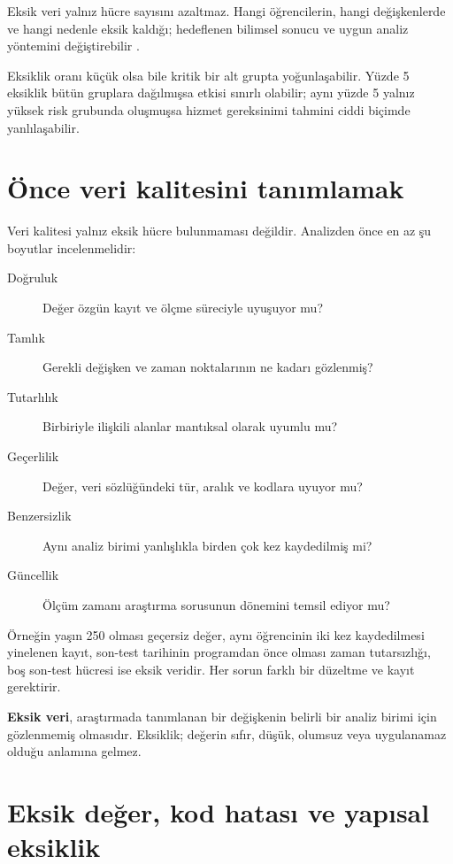 Eksik veri yalnız hücre sayısını azaltmaz. Hangi öğrencilerin, hangi
değişkenlerde ve hangi nedenle eksik kaldığı; hedeflenen bilimsel sonucu ve
uygun analiz yöntemini değiştirebilir \cite{little2019,rubin1976}.

\begin{researchbox}
Eksiklik oranı küçük olsa bile kritik bir alt grupta yoğunlaşabilir. Yüzde 5
eksiklik bütün gruplara dağılmışsa etkisi sınırlı olabilir; aynı yüzde 5 yalnız
yüksek risk grubunda oluşmuşsa hizmet gereksinimi tahmini ciddi biçimde
yanlılaşabilir.
\end{researchbox}

\section{Önce veri kalitesini tanımlamak}

Veri kalitesi yalnız eksik hücre bulunmaması değildir. Analizden önce en az şu
boyutlar incelenmelidir:

\begin{description}
  \item[Doğruluk] Değer özgün kayıt ve ölçme süreciyle uyuşuyor mu?
  \item[Tamlık] Gerekli değişken ve zaman noktalarının ne kadarı gözlenmiş?
  \item[Tutarlılık] Birbiriyle ilişkili alanlar mantıksal olarak uyumlu mu?
  \item[Geçerlilik] Değer, veri sözlüğündeki tür, aralık ve kodlara uyuyor mu?
  \item[Benzersizlik] Aynı analiz birimi yanlışlıkla birden çok kez kaydedilmiş mi?
  \item[Güncellik] Ölçüm zamanı araştırma sorusunun dönemini temsil ediyor mu?
\end{description}

Örneğin yaşın 250 olması geçersiz değer, aynı öğrencinin iki kez kaydedilmesi
yinelenen kayıt, son-test tarihinin programdan önce olması zaman tutarsızlığı,
boş son-test hücresi ise eksik veridir. Her sorun farklı bir düzeltme ve kayıt
gerektirir.

\begin{definitionbox}
\textbf{Eksik veri}, araştırmada tanımlanan bir değişkenin belirli bir analiz
birimi için gözlenmemiş olmasıdır. Eksiklik; değerin sıfır, düşük, olumsuz veya
uygulanamaz olduğu anlamına gelmez.
\end{definitionbox}

\section{Eksik değer, kod hatası ve yapısal eksiklik}

